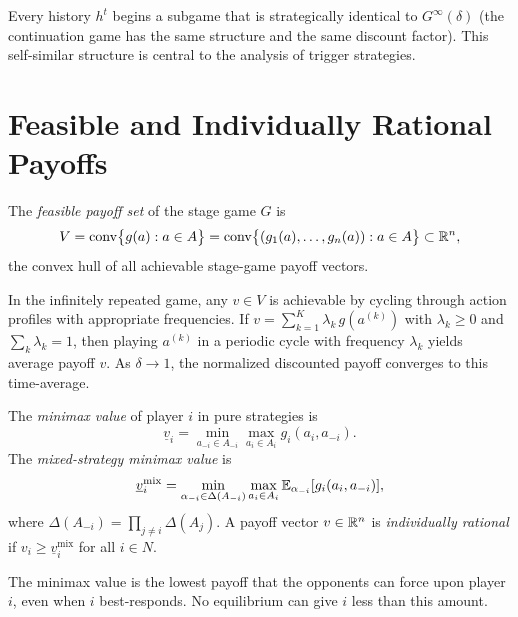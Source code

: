 \documentclass[11pt,a4paper]{article}
\begin{document}
\begin{remark}
Every history $h^t$ begins a subgame that is strategically identical to
$G^\infty(\delta)$ (the continuation game has the same structure and the
same discount factor). This self-similar structure is central to the
analysis of trigger strategies.
\end{remark}


\section{Feasible and Individually Rational Payoffs}
\label{sec:feasible-ir}

\begin{definition}
\label{def:feasible-payoffs}
The \emph{feasible payoff set} of the stage game $G$ is
\[
    V = \operatorname{conv}\bigl\{g(a) : a \in A\bigr\}
    = \operatorname{conv}\bigl\{(g_1(a), \ldots, g_n(a)) : a \in A\bigr\}
    \subset \mathbb{R}^n,
\]
the convex hull of all achievable stage-game payoff vectors.
\end{definition}

\begin{remark}
In the infinitely repeated game, any $v \in V$ is achievable by cycling
through action profiles with appropriate frequencies. If
$v = \sum_{k=1}^K \lambda_k\, g(a^{(k)})$ with $\lambda_k \geq 0$ and
$\sum_k \lambda_k = 1$, then playing $a^{(k)}$ in a periodic cycle with
frequency $\lambda_k$ yields average payoff $v$. As $\delta \to 1$, the
normalized discounted payoff converges to this time-average.
\end{remark}

\begin{definition}
\label{def:minimax-ir}
The \emph{minimax value} of player $i$ in pure strategies is
\[
    \underline{v}_i = \min_{a_{-i} \in A_{-i}}
    \max_{a_i \in A_i} g_i(a_i, a_{-i}).
\]
The \emph{mixed-strategy minimax value} is
\[
    \underline{v}_i^{\mathrm{mix}} = \min_{\alpha_{-i} \in \Delta(A_{-i})}
    \max_{a_i \in A_i}
    \mathbb{E}_{\alpha_{-i}}[g_i(a_i, a_{-i})],
\]
where $\Delta(A_{-i}) = \prod_{j \neq i} \Delta(A_j)$. A payoff vector
$v \in \mathbb{R}^n$ is \emph{individually rational} if
$v_i \geq \underline{v}_i^{\mathrm{mix}}$ for all $i \in N$.
\end{definition}

The minimax value is the lowest payoff that the opponents can force upon
player $i$, even when $i$ best-responds. No equilibrium can give $i$ less
than this amount.
\end{document}
